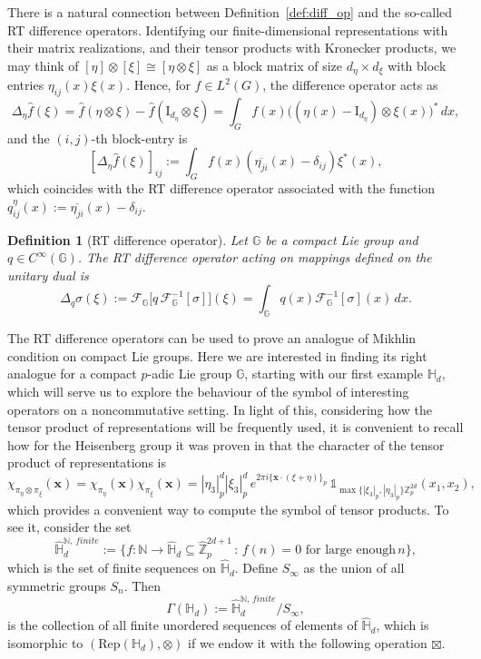 \documentclass[12pt, reqno]{amsart}
\newtheorem{defi}{Definition}[section]
\newcommand{\N}{\mathbb{N}}
\newcommand{\Z}{\mathbb{Z}}
\newcommand{\1}{\mathds{1}}
\newcommand{\G}{\mathbb{G}}
\begin{document}
There is a natural connection between Definition~\ref{def:diff_op} and the so-called RT difference operators. 
Identifying our finite-dimensional representations with their matrix realizations, and their tensor products with Kronecker products, 
we may think of $[\eta] \otimes [\xi] \cong [\eta \otimes \xi]$ as a block matrix of size $d_\eta \times d_\xi$ with block entries $\eta_{ij}(x)\xi(x)$. 
Hence, for $f \in L^2(G)$, the difference operator acts as
\[
\Delta_\eta\widehat{ f}(\xi) = \widehat{f}(\eta \otimes \xi) - \widehat{f}(\mathrm{I}_{d_\eta} \otimes \xi)
= \int_G f(x) \big( (\eta(x) - \mathrm{I}_{d_\eta}) \otimes \xi(x) \big)^* \, dx,
\]
and the $(i,j)$-th block-entry is
\[
[\Delta_\eta \widehat{f}(\xi)]_{ij} := \int_G f(x) (\overline{\eta_{ji}}(x) - \delta_{ij}) \xi^*(x),
\]
which coincides with the RT difference operator associated with the function $q^\eta_{ij}(x) := \overline{\eta_{ji}}(x) - \delta_{ij}$.

\begin{defi}[RT difference operator]
Let $\G$ be a compact Lie group and $q \in C^\infty(\G)$. The RT difference operator acting on mappings 
defined on the unitary dual is
\[
\Delta_q \sigma(\xi) := \mathcal{F}_\G \Big[ q \, \mathcal{F}_\G^{-1}[\sigma] \Big](\xi)
= \int_\G q(x) \mathcal{F}_\G^{-1}[\sigma](x) \, dx.
\]
\end{defi}

The RT difference operators can be used to prove an analogue of Mikhlin condition on compact Lie
groups. Here we are interested in finding its right analogue for a compact $p$-adic Lie group $\mathbb{G}$, starting with our first example $\mathbb{H}_d$, which will serve us to explore the behaviour of the symbol of interesting
operators on a noncommutative setting. In light of this, considering how the tensor product of representations will be frequently used, it is convenient to recall how for the Heisenberg group it was proven in
\cite{velasquezrodriguez2024heisenberg} that the character of the tensor product of representations is
\[
\chi_{\pi_\eta \otimes \pi_\xi}(\mathbf{x}) = \chi_{\pi_\eta}(\mathbf{x}) \chi_{\pi_\xi}(\mathbf{x}) 
= |\eta_3|_p^d |\xi_3|_p^d \, e^{2\pi i \{\mathbf{x} \cdot (\xi + \eta)\}_p} \, \mathbb{1}_{\max\{|\xi_3|_p, |\eta_3|_p\}\mathbb{Z}_p^{2d}}(x_1,x_2),
\]
which provides a convenient way to compute the symbol of tensor products. To see it, consider the set $$\widehat{\mathbb{H}}_d^{\N, \, finite} := \{ f: \N \to \widehat{\mathbb{H}}_d \subseteq \widehat{\Z}_p^{2d+1} \, : \, f(n)=0 \,\, \text{for large enough} \, n  \},$$which is the set of finite sequences on $\widehat{\mathbb{H}}_d$. Define $S_\infty$ as the union of all symmetric groups $S_n$. Then $$\Gamma(\mathbb{H}_d):= \widehat{\mathbb{H}}_d^{\N, \, finite}/ S_\infty,$$is the collection of all finite unordered sequences of elements of $\widehat{\mathbb{H}}_d$, which is isomorphic to $(\mathrm{Rep}(\mathbb{H}_d), \otimes)$ if we endow it with the following operation $\boxtimes$.   
\end{document}
